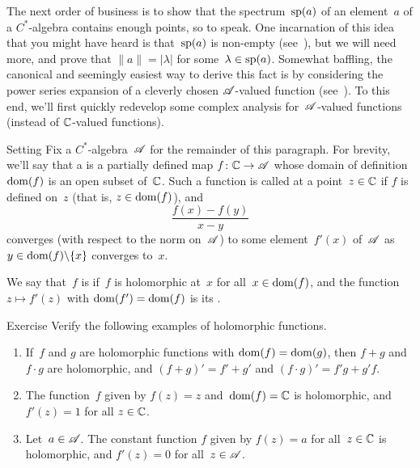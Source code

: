 \documentclass[a]{subfiles}
\begin{document}
\begin{parsec}%
\begin{point}%
The next order of business
is to show that the spectrum~$\mathrm{sp}(a)$ of an element~$a$
of a $C^*$-algebra contains enough points, so to speak.
One incarnation of this idea that you might have heard
is that~$\mathrm{sp}(a)$ is non-empty
(see~), but
we will need more,
and prove that  $\|a\|=\left|\lambda\right|$
for some~$\lambda\in\mathrm{sp}(a)$.
Somewhat baffling,
the canonical and seemingly
easiest way to derive this fact is by considering the power series
expansion of a cleverly chosen $\mathscr{A}$-valued function
(see~).
To this end,
we'll first quickly redevelop some complex analysis
for~$\mathscr{A}$-valued functions
(instead of $\mathbb{C}$-valued functions).
\end{point}
\begin{point}{Setting}%
Fix a $C^*$-algebra~$\mathscr{A}$ for the remainder of this paragraph.
For brevity,
we'll say that a 
is a partially defined map $f\colon \mathbb{C}\to \mathscr{A}$
whose domain of definition $\operatorname{dom}(f)$ is an open subset of~$\mathbb{C}$.
Such a function is called  at a point~$z\in \mathbb{C}$
if $f$ is defined on~$z$ (that is, $z\in \operatorname{dom}(f)$),
and 
\begin{equation*}
\frac{f(x)-f(y)}{x-y}
\end{equation*}
converges (with respect to the norm on~$\mathscr{A}$)
to some element~$f'(x)$ of~$\mathscr{A}$
as $y\in \operatorname{dom}(f)\backslash\{x\}$
converges to~$x$.

We say that~$f$ is 
if~$f$ is holomorphic at~$x$ for all~$x\in \operatorname{dom}(f)$,
and the function $z\mapsto f'(z)$
with $\operatorname{dom}(f')=\operatorname{dom}(f)$
is its .
\end{point}
\begin{point}{Exercise}%
Verify the following examples of holomorphic functions.
\begin{enumerate}
\item
If~$f$ and $g$ are holomorphic functions with $\operatorname{dom}(f)=\operatorname{dom}(g)$,
then $f+g$ and $f\cdot g$ are holomorphic,
and $(f+g)'=f'+g'$ and $(f\cdot g)' = f'g+g'f$.

\item
The function~$f$ given by $f(z)=z$ and~$\operatorname{dom}(f)=\mathbb{C}$
is holomorphic, and $f'(z)=1$ for all $z\in\mathbb{C}$.

\item
Let~$a\in \mathscr{A}$. The constant function $f$ given by $f(z)=a$
for all~$z\in \mathbb{C}$ is holomorphic, and $f'(z)=0$ for all~$z\in \mathscr{A}$.


\end{enumerate}
\end{point}
\end{parsec}
\end{document}
